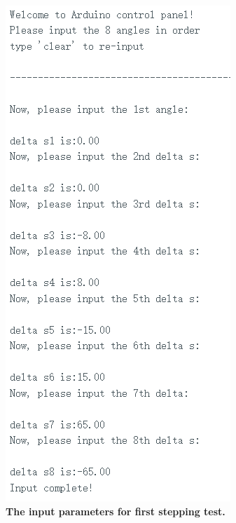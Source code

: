 \begin{figure}[H] %
    \centering %
    \captionsetup{labelsep=colon}
    \includegraphics[width=0.65\linewidth]{Image/Code-Display/arduino1.png}
    \caption[]
    {\centering \textbf{The input parameters for first stepping test.}}
    \label{fig:arduino_code_display_1}
\end{figure}


